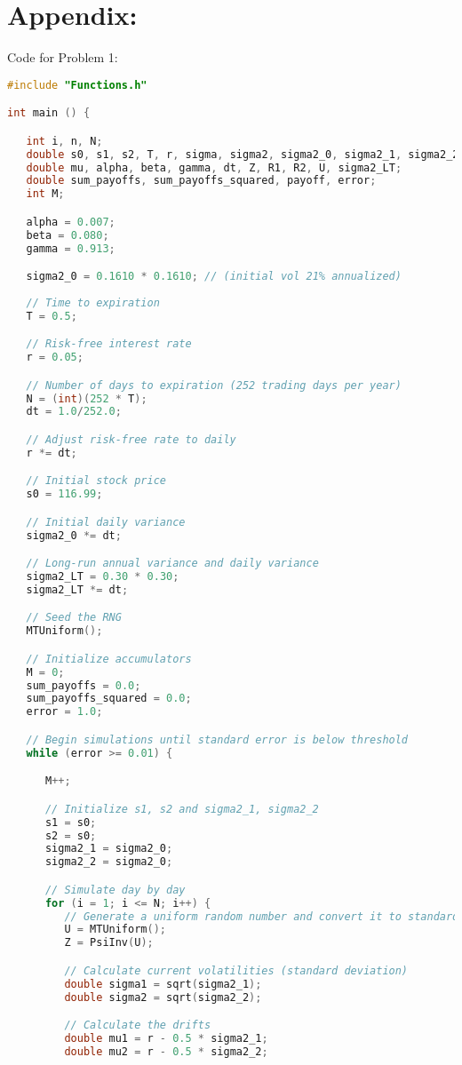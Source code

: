 \documentclass{report}
\begin{document}
\setcounter{page}{1}
\section*{Appendix:}
Code for Problem 1:
\begin{lstlisting}[language=C++]
#include "Functions.h"

int main () {

   int i, n, N;
   double s0, s1, s2, T, r, sigma, sigma2, sigma2_0, sigma2_1, sigma2_2;
   double mu, alpha, beta, gamma, dt, Z, R1, R2, U, sigma2_LT;
   double sum_payoffs, sum_payoffs_squared, payoff, error;
   int M;

   alpha = 0.007;
   beta = 0.080;
   gamma = 0.913;

   sigma2_0 = 0.1610 * 0.1610; // (initial vol 21% annualized)
   
   // Time to expiration
   T = 0.5;

   // Risk-free interest rate
   r = 0.05;

   // Number of days to expiration (252 trading days per year)
   N = (int)(252 * T);
   dt = 1.0/252.0;

   // Adjust risk-free rate to daily
   r *= dt;

   // Initial stock price
   s0 = 116.99;

   // Initial daily variance
   sigma2_0 *= dt;

   // Long-run annual variance and daily variance
   sigma2_LT = 0.30 * 0.30;
   sigma2_LT *= dt;

   // Seed the RNG
   MTUniform();

   // Initialize accumulators
   M = 0;
   sum_payoffs = 0.0;
   sum_payoffs_squared = 0.0;
   error = 1.0;

   // Begin simulations until standard error is below threshold
   while (error >= 0.01) {

      M++;

      // Initialize s1, s2 and sigma2_1, sigma2_2
      s1 = s0;
      s2 = s0;
      sigma2_1 = sigma2_0;
      sigma2_2 = sigma2_0;

      // Simulate day by day
      for (i = 1; i <= N; i++) {
         // Generate a uniform random number and convert it to standard normal
         U = MTUniform();
         Z = PsiInv(U);

         // Calculate current volatilities (standard deviation)
         double sigma1 = sqrt(sigma2_1);
         double sigma2 = sqrt(sigma2_2);

         // Calculate the drifts
         double mu1 = r - 0.5 * sigma2_1;
         double mu2 = r - 0.5 * sigma2_2;


\end{lstlisting}
\end{document}
